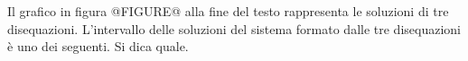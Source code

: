 Il grafico in figura @FIGURE@ alla fine del testo
rappresenta le soluzioni di tre disequazioni.
L’intervallo delle soluzioni del sistema formato 
dalle tre disequazioni è uno dei seguenti. 
Si dica quale.